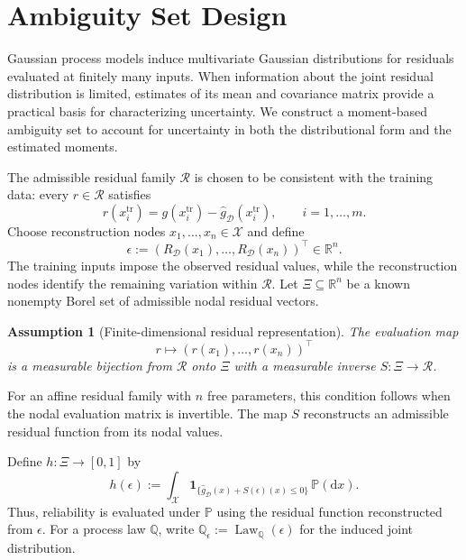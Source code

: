 \documentclass[review,11pt,3p,authoryear,nopreprintline]{elsarticle}
\newtheorem{assumption}{Assumption}
\begin{document}
\section{Ambiguity Set Design}

Gaussian process models induce multivariate Gaussian
distributions for residuals evaluated at finitely many inputs.
When information about the joint residual distribution is
limited, estimates of its mean and covariance matrix provide
a practical basis for characterizing uncertainty.
We construct a moment-based ambiguity set to account for
uncertainty in both the distributional form and the estimated
moments.

The admissible residual family $\mathcal{R}$ is chosen to be
consistent with the training data: every $r\in\mathcal{R}$
satisfies
\[
  r(x_i^{\mathrm{tr}})
  =
  g(x_i^{\mathrm{tr}})
  -\hat{g}_{\mathcal{D}}(x_i^{\mathrm{tr}}),
  \qquad i=1,\ldots,m.
\]
Choose reconstruction nodes $x_1,\ldots,x_n\in\mathcal{X}$
and define
\[
  \epsilon
  := \left(
    R_{\mathcal{D}}(x_1),\ldots,R_{\mathcal{D}}(x_n)
  \right)^{\top}
  \in\mathbb{R}^{n}.
\]
The training inputs impose the observed residual values,
while the reconstruction nodes identify the remaining
variation within $\mathcal{R}$.
Let $\Xi\subseteq\mathbb{R}^{n}$ be a known nonempty Borel
set of admissible nodal residual vectors.

\begin{assumption}[Finite-dimensional residual representation]
\label{ass-residual-reconstruction}
  The evaluation map
  \[
    r\longmapsto
    \left(r(x_1),\ldots,r(x_n)\right)^{\top}
  \]
  is a measurable bijection from $\mathcal{R}$ onto $\Xi$
  with a measurable inverse $S:\Xi\to\mathcal{R}$.
\end{assumption}

For an affine residual family with $n$ free parameters,
this condition follows when the nodal evaluation matrix
is invertible.
The map $S$ reconstructs an admissible residual function
from its nodal values.

Define $h:\Xi\to[0,1]$ by
\begin{equation}
  h(\epsilon)
  :=
  \int_{\mathcal{X}}
    \mathbf{1}_{\{
      \hat{g}_{\mathcal{D}}(x)+S(\epsilon)(x)\leq0
    \}}\,
    \mathbb{P}(\mathrm{d}x).
  \label{eq-residual-failure-function}
\end{equation}
Thus, reliability is evaluated under $\mathbb{P}$ using
the residual function reconstructed from $\epsilon$.
For a process law $\mathbb{Q}$, write
$\mathbb{Q}_{\epsilon}
:=\operatorname{Law}_{\mathbb{Q}}(\epsilon)$
for the induced joint distribution.
\end{document}
